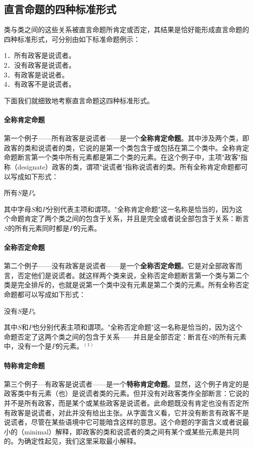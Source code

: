 \subsection{直言命题的四种标准形式}

类与类之间的这些关系被直言命题所肯定或否定，其结果是恰好能形成直言命题的四种标准形式，可分别由如下标准命题例示：

1．所有政客是说谎者。\\
2．没有政客是说谎者。\\
3．有政客是说说者。\\
4．有政客不是说谎者。

下面我们就细致地考察直言命题这四种标准形式。

\paragraph{全称肯定命题}
第一个例子——所有政客是说谎者——是一个\textbf{全称肯定命题}。其中涉及两个类，即政客的类和说谎者的类，它说的是第一个类包含于或包括在第二个类中。全称肯定命题断言第一个类中所有元素都是第二个类的元素。在这个例子中，主项"政客"指称（designate）政客的类，谓项"说谎者"指称说谎者的类。所有全称肯定命题都可以写成如下形式：

所有$S$是$P$。

其中字母$S$和$P$分别代表主项和谓项。"全称肯定命题"这一名称是恰当的，因为这个命题肯定了两个类之间的包含于关系，并且是完全或者说全部包含于关系：断言$S$的所有元素同时都是$P$的元素。

\paragraph{全称否定命题}
第二个例子——没有政客是说谎者——是一个\textbf{全称否定命题}。它是对全部政客而言，否定他们是说谎者。就这样两个类来说，全称否定命题断言第一个类与第二个类是完全排斥的，也就是说第一个类中没有元素是第二个类的元素。所有全称否定命题都可以写成如下形式：

没有$S$是$P$。

其中$S$和$P$也分别代表主项和谓项。"全称否定命题"这一名称是恰当的，因为这个命题否定了这两个类之间的包含于关系——并且是全部否定：断言在$S$的所有元素中，没有一个是$P$的元素。${ }^{(1)}$

\paragraph{特称肯定命题}
第三个例子—有政客是说谎者——是一个\textbf{特称肯定命题}。显然，这个例子肯定的是政客类中有元素（也）是说谎者类的元素。但并没有对政客类作全部断言：它说的并不是所有政客，而是某个或某些政客是说谎者。此命题既没有肯定也没有否定所有政客是说谎者，对此并没有给出主张。从字面含义看，它并没有断言有政客不是说谎者，尽管在某些语境中它可能暗含这样的意思。这个命题的字面含义或者说最小的（minimal）解释，即政客的类和说谎者的类之间有某个或某些元素是共同的。为确定性起见，我们这里采取最小解释。

